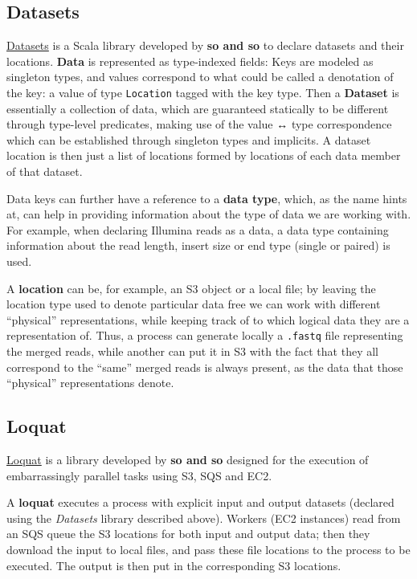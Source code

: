 \documentclass{frontiersSCNS} %
\begin{document}
\subsection{Datasets}\label{datasets}

\href{https://github.com/ohnosequences/datasets}{Datasets} is a Scala
library developed by \textbf{so and so} to declare datasets and their
locations. \textbf{Data} is represented as type-indexed fields: Keys are
modeled as singleton types, and values correspond to what could be
called a denotation of the key: a value of type \texttt{Location} tagged
with the key type. Then a \textbf{Dataset} is essentially a collection
of data, which are guaranteed statically to be different through
type-level predicates, making use of the value ↔ type correspondence
which can be established through singleton types and implicits. A
dataset location is then just a list of locations formed by locations of
each data member of that dataset.

Data keys can further have a reference to a \textbf{data type}, which,
as the name hints at, can help in providing information about the type
of data we are working with. For example, when declaring Illumina reads
as a data, a data type containing information about the read length,
insert size or end type (single or paired) is used.

A \textbf{location} can be, for example, an S3 object or a local file;
by leaving the location type used to denote particular data free we can
work with different ``physical'' representations, while keeping track of
to which logical data they are a representation of. Thus, a process can
generate locally a \texttt{.fastq} file representing the merged reads,
while another can put it in S3 with the fact that they all correspond to
the ``same'' merged reads is always present, as the data that those
``physical'' representations denote.

\subsection{Loquat}\label{loquat}

\href{https://github.com/ohnosequences/loquat}{Loquat} is a library
developed by \textbf{so and so} designed for the execution of
embarrassingly parallel tasks using S3, SQS and EC2.

A \textbf{loquat} executes a process with explicit input and output
datasets (declared using the \emph{Datasets} library described above).
Workers (EC2 instances) read from an SQS queue the S3 locations for both
input and output data; then they download the input to local files, and
pass these file locations to the process to be executed. The output is
then put in the corresponding S3 locations.
\end{document}
